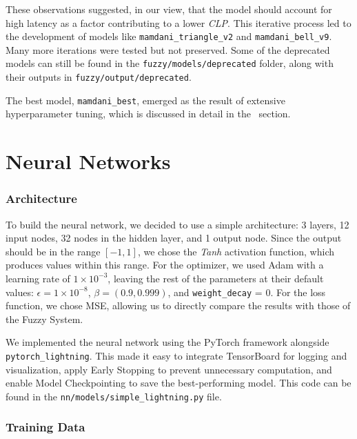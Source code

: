 \documentclass[titlepage]{article}
\begin{document}
These observations suggested, in our view, that the model should account for high latency as a factor contributing to a lower \emph{CLP}.
This iterative process led to the development of models like \texttt{mamdani\_triangle\_v2} and \texttt{mamdani\_bell\_v9}.\\
Many more iterations were tested but not preserved.
Some of the deprecated models can still be found in the \texttt{fuzzy/models/deprecated} folder, along with their outputs in \texttt{fuzzy/output/deprecated}.

The best model, \texttt{mamdani\_best}, emerged as the result of extensive hyperparameter tuning, which is discussed in detail in the~ section.




\part{Neural Networks}

\section{Architecture}

To build the neural network, we decided to use a simple architecture: 3 layers, 12 input nodes, 32 nodes in the hidden layer, and 1 output node.
Since the output should be in the range \([-1, 1]\), we chose the \emph{Tanh} activation function, which produces values within this range.
For the optimizer, we used Adam with a learning rate of $1 \times 10^{-3}$, leaving the rest of the parameters at their default values: $\epsilon = 1 \times 10^{-8}$, $\beta = (0.9, 0.999)$, and \texttt{weight\_decay} = 0.
For the loss function, we chose MSE, allowing us to directly compare the results with those of the Fuzzy System.

We implemented the neural network using the PyTorch framework alongside \newline \texttt{pytorch\_lightning}.
This made it easy to integrate TensorBoard for logging and visualization, apply Early Stopping to prevent unnecessary computation, and enable Model Checkpointing to save the best-performing model.
This code can be found in the \texttt{nn/models/simple\_lightning.py} file.

\section{Training Data}
\end{document}
